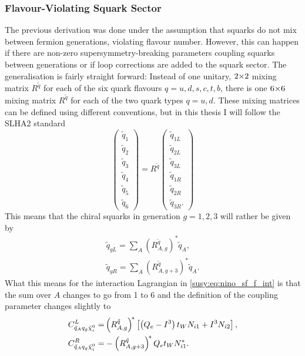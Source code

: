\documentclass[../main.tex]{subfiles}
\begin{document}
\subsubsection*{Flavour-Violating Squark Sector}
The previous derivation was done under the assumption that squarks do not mix between fermion generations, violating flavour number.
However, this can happen if there are non-zero supersymmetry-breaking parameters coupling squarks between generations or if loop corrections are added to the squark sector.
The generalisation is fairly straight forward: Instead of one unitary, \(2 {\times} 2\) mixing matrix \(R^{\tilde{q}}\) for each of the six quark flavours \(q = u, d, s, c, t, b\), there is one \(6 {\times} 6\) mixing matrix \(R^{\tilde{q}}\) for each of the two quark types \(q = u, d\).
These mixing matrices can be defined using different conventions, but in this thesis I will follow the SLHA2 standard~\cite{SLHA2}
\begin{equation}
  \begin{pmatrix}
    \tilde{q}_1 \\ \tilde{q}_2 \\ \tilde{q}_3 \\ \tilde{q}_4 \\ \tilde{q}_5 \\ \tilde{q}_6
  \end{pmatrix}
  = R^{\tilde{q}} \begin{pmatrix}
    \tilde{q}_{1L} \\ \tilde{q}_{2L} \\ \tilde{q}_{3L} \\ \tilde{q}_{1R} \\ \tilde{q}_{2R} \\ \tilde{q}_{3R}.
  \end{pmatrix}
\end{equation}
This means that the chiral squarks in generation \(g = 1,2,3\) will rather be given by
\begin{subequations}
  \begin{align}
    \tilde{q}_{gL} = \sum_A (R^{\tilde{q}}_{A,g})^\ast \tilde{q}_A, \\
    \tilde{q}_{gR} = \sum_A (R^{\tilde{q}}_{A,g+3})^\ast \tilde{q}_A.
  \end{align}
\end{subequations}
What this means for the interaction Lagrangian in \cref{susy:eq:nino_sf_f_int} is that the sum over \(A\) changes to go from 1 to 6 and the definition of the coupling parameter changes slightly to
\begin{subequations}
  \begin{align}
    C_{\tilde{q}_A q_g \tilde{\chi}_i^0}^{L} = & \left(R^{\tilde{q}}_{A,g}\right)^{\!\ast} \left[\left(Q_e-I^3\right)t_W N_{i1} + I^3 N_{i2}\right], \\
    C_{\tilde{q}_A q_g \tilde{\chi}_i^0}^{R} = & -\left(R^{\tilde{q}}_{A,g+3}\right)^{\!\ast} Q_e t_W N_{i1}^\ast.
  \end{align}
\end{subequations}
\end{document}
